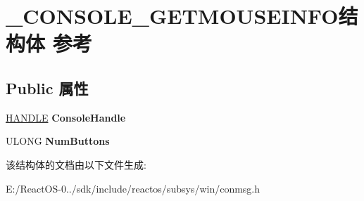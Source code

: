 \hypertarget{struct___c_o_n_s_o_l_e___g_e_t_m_o_u_s_e_i_n_f_o}{}\section{\+\_\+\+C\+O\+N\+S\+O\+L\+E\+\_\+\+G\+E\+T\+M\+O\+U\+S\+E\+I\+N\+F\+O结构体 参考}
\label{struct___c_o_n_s_o_l_e___g_e_t_m_o_u_s_e_i_n_f_o}
\subsection*{Public 属性}
\begin{DoxyCompactItemize}
\item 
\mbox{\label{struct___c_o_n_s_o_l_e___g_e_t_m_o_u_s_e_i_n_f_o_a471f4d124e281c6611f63411adbd5cc3}} 
\hyperlink{interfacevoid}{H\+A\+N\+D\+LE} {\bfseries Console\+Handle}
\item 
\mbox{\label{struct___c_o_n_s_o_l_e___g_e_t_m_o_u_s_e_i_n_f_o_a6cf6686354d377bf0df3d8b94314401e}} 
U\+L\+O\+NG {\bfseries Num\+Buttons}
\end{DoxyCompactItemize}


该结构体的文档由以下文件生成\+:\begin{DoxyCompactItemize}
\item 
E\+:/\+React\+O\+S-\/0../sdk/include/reactos/subsys/win/conmsg.\+h\end{DoxyCompactItemize}
